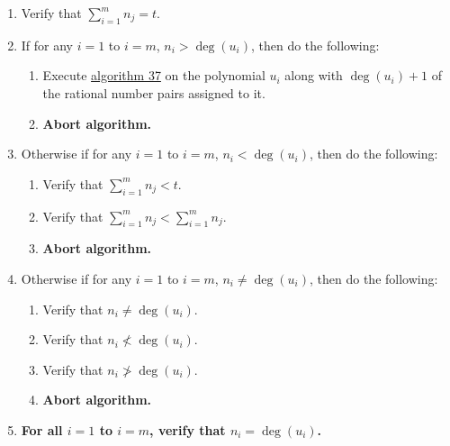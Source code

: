 \documentclass[twocolumn]{article}
\begin{document}
\begin{enumerate}
				\item Verify that $\sum_{i=1}^m n_j=t$.
				\item If for any $i=1$ to $i=m$, $n_i>\deg(u_i)$, then do the following:
				\begin{enumerate}
					\item Execute \hyperref[sec:algorithm 37]{algorithm 37} on the polynomial $u_i$ along with $\deg(u_i)+1$ of the rational number pairs assigned to it.
					\item \textbf{Abort algorithm.}
				\end{enumerate}
				\item Otherwise if for any $i=1$ to $i=m$, $n_i<\deg(u_i)$, then do the following:
				\begin{enumerate}
					\item Verify that $\sum_{i=1}^m n_j<t$.
					\item Verify that $\sum_{i=1}^m n_j<\sum_{i=1}^m n_j$.
					\item \textbf{Abort algorithm.}
				\end{enumerate}
				\item Otherwise if for any $i=1$ to $i=m$, $n_i\ne\deg(u_i)$, then do the following:
				\begin{enumerate}
					\item Verify that $n_i\ne\deg(u_i)$.
					\item Verify that $n_i\nless\deg(u_i)$.
					\item Verify that $n_i\ngtr\deg(u_i)$.
					\item \textbf{Abort algorithm.}
				\end{enumerate}
				\item \textbf{For all $i=1$ to $i=m$, verify that $n_i=\deg(u_i)$.}
			\end{enumerate}
\end{document}
